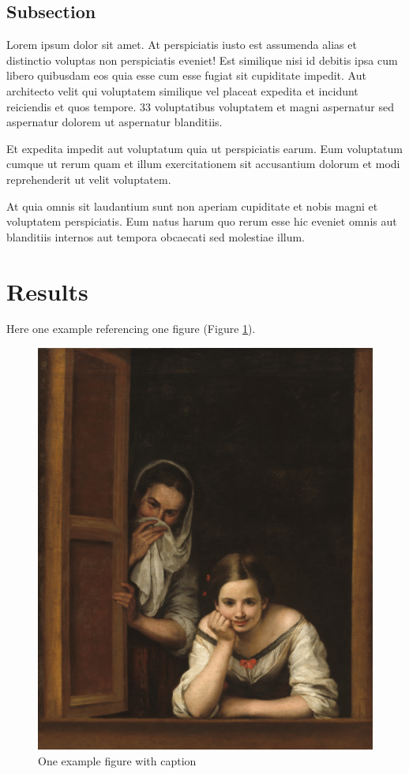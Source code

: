 \documentclass[
  12pt,
]{article}
\begin{document}
\hypertarget{subsection}{%
\subsection{Subsection}\label{subsection}}

Lorem ipsum dolor sit amet. At perspiciatis iusto est assumenda alias et distinctio voluptas non perspiciatis eveniet! Est similique nisi id debitis ipsa cum libero quibusdam eos quia esse cum esse fugiat sit cupiditate impedit. Aut architecto velit qui voluptatem similique vel placeat expedita et incidunt reiciendis et quos tempore. 33 voluptatibus voluptatem et magni aspernatur sed aspernatur dolorem ut aspernatur blanditiis.

Et expedita impedit aut voluptatum quia ut perspiciatis earum. Eum voluptatum cumque ut rerum quam et illum exercitationem sit accusantium dolorum et modi reprehenderit ut velit voluptatem.

At quia omnis sit laudantium sunt non aperiam cupiditate et nobis magni et voluptatem perspiciatis. Eum natus harum quo rerum esse hic eveniet omnis aut blanditiis internos aut tempora obcaecati sed molestiae illum.

\hypertarget{results}{%
\section{Results}\label{results}}

Here one example referencing one figure (Figure \ref{fig:ventana}).

\begin{figure}
\includegraphics[width=1\linewidth]{../../figures/two_women_at_a_window_1942.9.46} \caption{One example figure with caption}\label{fig:ventana}
\end{figure}
\end{document}
